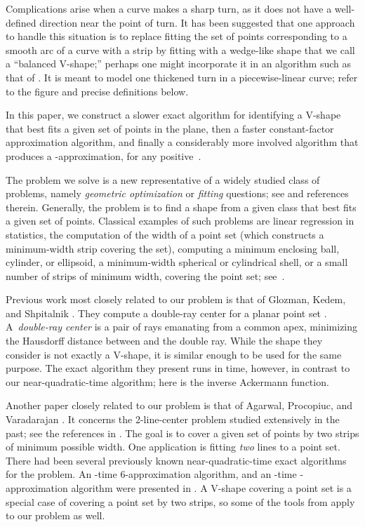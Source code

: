\documentclass{llncs}
\begin{document}
Complications arise when a curve makes a sharp turn, as it does not
have a well-defined direction near the point of turn.  It has been
suggested \cite{curve-noisy,proj-clustering} that one approach to handle this situation
is to replace fitting the set of points corresponding to a smooth arc of a
curve with a strip by fitting with a wedge-like shape that we call a ``balanced
V-shape;'' perhaps one might incorporate it in an algorithm such as
that of
\cite{Funke-Ramos}.  It is meant to model one thickened turn in a 
piecewise-linear curve; refer to the figure and precise
definitions below.

In this paper, we construct a slower exact algorithm for identifying a V-shape that best
fits a given set of points in the plane, then a
faster constant-factor approximation algorithm, and finally a
considerably more involved algorithm that produces a
-approximation, for any positive~.

The problem we solve is a new representative of a widely studied class
of problems, namely \emph{geometric optimization} or \emph{fitting}
questions; see
\cite{coreset-survey,random-opt-survey,alg-opt-survey,eff-alg-opt-survey}
and references therein.  Generally, the problem is to find a shape
from a given class that best fits a given set of points.  Classical
examples of such problems are linear regression in statistics, the
computation of the width of a point set (which constructs a
minimum-width strip covering the set), computing a minimum enclosing
ball, cylinder, or ellipsoid, a minimum-width spherical or
cylindrical shell, or a small number of strips of minimum width,
covering the point set; see~\cite{chan-apx-all,coreset-survey}.

Previous work most closely related to our problem is that of Glozman,
Kedem, and Shpitalnik \cite{GKS}.  They compute a double-ray center
for a planar point set .  A~\emph{double-ray center} is a pair of
rays emanating from a common apex, minimizing the Hausdorff distance
between  and the double ray.  While the shape they consider is not
exactly a V-shape, it is similar enough to be used for the same
purpose.  The exact algorithm they present runs in  time, however, in contrast to our near-quadratic-time
algorithm; here  is the inverse Ackermann function.

Another paper closely related to our problem is that of Agarwal,
Procopiuc, and Varadarajan \cite{2-line-center}.
It concerns the
2-line-center problem studied extensively in the past; see the
references in \cite{2-line-center}.  The goal is to cover a given set
of points by two strips of minimum possible width.  One
application is fitting \emph{two} lines to a point set.  There had
been several previously known near-quadratic-time exact algorithms for
the problem.  An -time 6-approximation algorithm, and an
-time
-approximation algorithm were presented in
\cite{2-line-center}.  A V-shape covering a point set is a special
case of covering a point set by two strips, so some of the
tools from \cite{2-line-center} apply to our problem as well.
\end{document}
